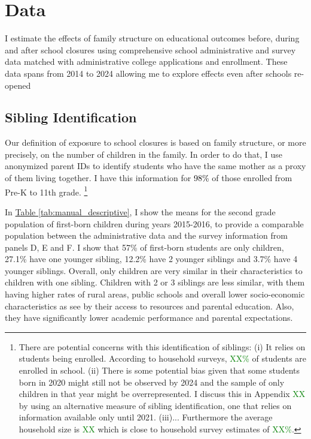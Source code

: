 \section{Data}\label{sec:data}
I estimate the effects of family structure on educational outcomes before, during and after school closures using comprehensive school administrative and survey data matched with administrative college applications and enrollment. These data spans from 2014 to 2024 allowing me to explore effects even after schools re-opened

\subsection{Sibling Identification}

Our definition of exposure to school closures is based on family structure, or more precisely, on the number of children in the family. In order to do that, I use anonymized parent IDs to identify students who have the same mother as a proxy of them living together. I have this information for \textcolor{black}{98\%} of those enrolled from Pre-K to 11th grade. \footnote{There are potential concerns with this identification of siblings: (i) It relies on students being enrolled. According to household surveys, \textcolor{green}{XX\%} of students are enrolled in school. (ii) There is some potential bias given that some students born in 2020 might still not be observed by 2024 and the sample of only children in that year might be overrepresented. I discuss this in Appendix \textcolor{green}{XX} by using an alternative measure of sibling identification, one that relies on information available only until 2021. (iii)... Furthermore the average household size is \textcolor{green}{XX} which is close to household survey estimates of \textcolor{green}{XX\%}.} 

In \hyperref[tab:manual_descriptive]{Table \ref{tab:manual_descriptive}}, I show the means for the second grade population of first-born children during years 2015-2016, to provide a comparable population between the administrative data and the survey information from panels D, E and F. I show that 57\% of first-born students are only children, 27.1\% have one younger sibling, 12.2\% have 2 younger siblings and 3.7\% have 4 younger siblings. Overall, only children are very similar in their characteristics to children with one sibling. Children with 2 or 3 siblings are less similar, with them having higher rates of rural areas, public schools and overall lower socio-economic characteristics as see by their access to resources and parental education. Also, they have significantly lower academic performance and parental expectations.


